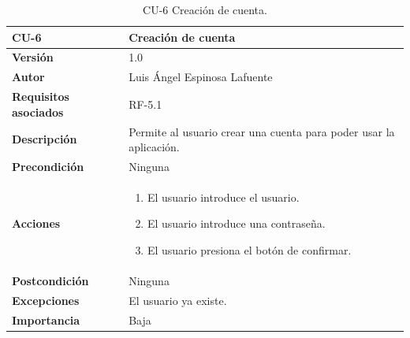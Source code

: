 \begin{table}[p]
	\centering
	\begin{tabularx}{\linewidth}{ p{} p{} }
		\toprule
		\textbf{CU-6}    & \textbf{Creación de cuenta}\\
		\toprule
		\textbf{Versión}              & 1.0    \\
		\textbf{Autor}                &  Luis Ángel Espinosa Lafuente \\
		\textbf{Requisitos asociados} & RF-5.1\\
		\textbf{Descripción}          & Permite al usuario crear una cuenta para poder usar la aplicación.\\
		\textbf{Precondición}         & Ninguna\\
		\textbf{Acciones}             &
		\begin{enumerate}
			\def\labelenumi{\arabic{enumi}.}
			\tightlist
			\item El usuario introduce el usuario.
			\item El usuario introduce una contraseña.
			\item El usuario presiona el botón de confirmar.
		\end{enumerate}\\
		\textbf{Postcondición}        & Ninguna \\
		\textbf{Excepciones}          & El usuario ya existe. \\
		\textbf{Importancia}          & Baja \\
		\bottomrule
	\end{tabularx}
	\caption{CU-6 Creación de cuenta.}
\end{table}

